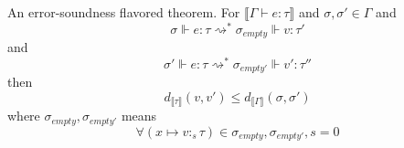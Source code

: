 An error-soundness flavored theorem. For $\llbracket \Gamma \vdash e : \tau
\rrbracket$ and $\sigma, \sigma' \in \Gamma$ and
$$\sigma \Vdash e : \tau \rightsquigarrow^* \sigma_{empty} \Vdash v : \tau'$$ 
and 
$$\sigma' \Vdash e : \tau \rightsquigarrow^* \sigma_{empty'} \Vdash v' : \tau''$$
then
$$
d_{\llbracket \tau \rrbracket}(v, v') \leq d_{\llbracket \Gamma \rrbracket}(\sigma, \sigma')
$$
where $\sigma_{empty}, \sigma_{empty'}$ means
$$
\forall (x \mapsto v :_s \tau) \in \sigma_{empty}, \sigma_{empty'}, s = 0
$$

